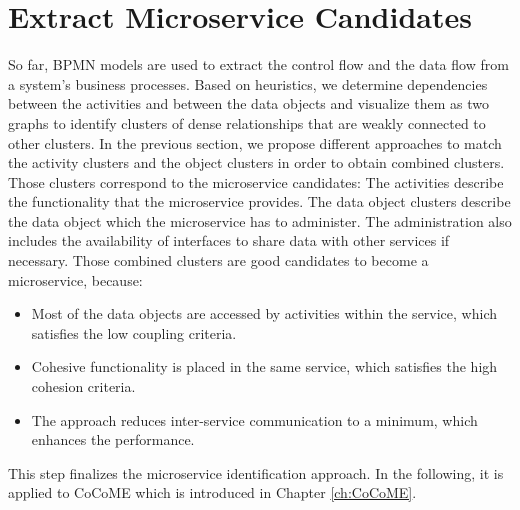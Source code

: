 \section{Extract Microservice Candidates}
\label{sec:Solution:ExtractMicroserviceCandidates}
So far, BPMN models are used to extract the control flow and the data flow from a system's business processes. Based on heuristics, we determine dependencies between the activities and between the data objects and visualize them as two graphs to identify clusters of dense relationships that are weakly connected to other clusters. In the previous section, we propose different approaches to match the activity clusters and the object clusters in order to obtain combined clusters. Those clusters correspond to the microservice candidates: The activities describe the functionality that the microservice provides. The data object clusters describe the data object which the microservice has to administer. The administration also includes the availability of interfaces to share data with other services if necessary.
Those combined clusters are good candidates to become a microservice, because:
\begin{itemize}
	\item Most of the data objects are accessed by activities within the service, which satisfies the low coupling criteria.
	\item Cohesive functionality is placed in the same service, which satisfies the high cohesion criteria.
	\item The approach reduces inter-service communication to a minimum, which enhances the performance.
\end{itemize}

This step finalizes the microservice identification approach. In the following, it is applied to CoCoME which is introduced in Chapter \ref{ch:CoCoME}. 










